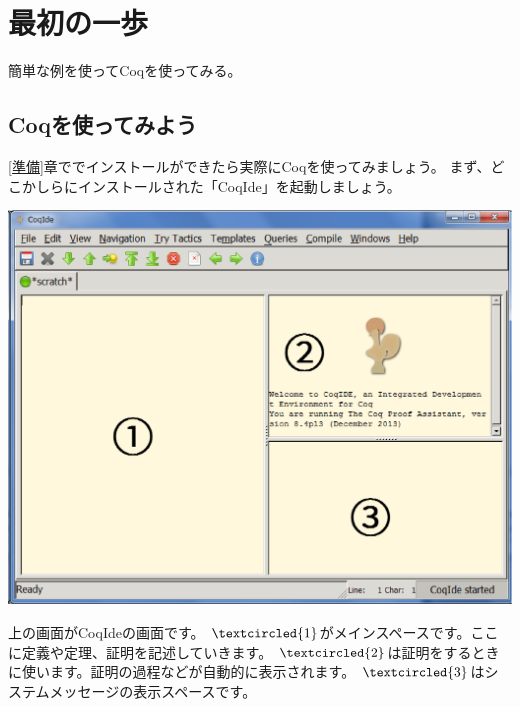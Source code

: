 \documentclass{jsbook}
\begin{document}
\chapter{最初の一歩}
	簡単な例を使ってCoqを使ってみる。
\newpage
\section{Coqを使ってみよう}
	\ref{準備}章ででインストールができたら実際にCoqを使ってみましょう。
	まず、どこかしらにインストールされた「CoqIde」を起動しましょう。
	
\begin{center}
	\includegraphics[width=38zw]{image/coqScrean.eps}\\
	\label{coqの画面}
\end{center}

上の画面がCoqIdeの画面です。
$ \textcircled{\footnotesize1} $がメインスペースです。ここに定義や定理、証明を記述していきます。
$ \textcircled{\footnotesize2} $は証明をするときに使います。証明の過程などが自動的に表示されます。
$ \textcircled{\footnotesize3} $はシステムメッセージの表示スペースです。
\end{document}
